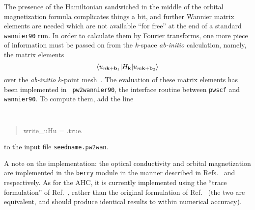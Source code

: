 The presence of the Hamiltonian sandwiched in the middle of the
orbital magnetization formula complicates things a bit, and further
Wannier matrix elements are needed which are not
available ``for free'' at the end of a standard {\tt wannier90}
run. In order to calculate them by Fourier transforms, one more piece
of information must be passed on from the $k$-space {\it ab-initio}
calculation, namely, the matrix elements
%
$$\langle u_{n{\bf k}+{\bf b}_1}\vert
H_{\bf k}\vert u_{m{\bf k}+{\bf b}_2}\rangle
$$
%
over the {\it ab-initio} $k$-point mesh~\cite{lopez-prb12}.  The
evaluation of these matrix elements has been implemented in {\tt
  pw2wannier90}, the interface routine between {\tt pwscf} and {\tt
  wannier90}. To compute them, add the line
%
{\tt
\begin{quote}
write\_uHu = .true.
\end{quote}
}
%
to the input file {\tt seedname.pw2wan}.

A note on the implementation: the optical conductivity and orbital
magnetization are implemented in the {\tt berry} module in the manner
described in Refs.~\cite{yates-prb07} and \cite{lopez-prb12}
respectively. As for the AHC, it is currently implemented using the
``trace formulation'' of Ref.~\cite{lopez-prb12}, rather than the
original formulation of Ref.~\cite{wang-prb06} (the two are
equivalent, and should produce identical results to within numerical
accuracy).
